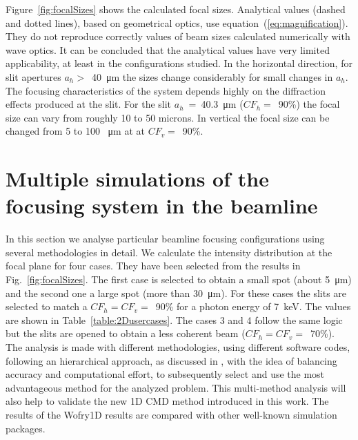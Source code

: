 \documentclass{iucr}              %
\begin{document}
Figure~\ref{fig:focalSizes} shows the calculated focal sizes. Analytical values (dashed and dotted lines), based on geometrical optics, use  equation~(\ref{eq:magnification}). They do not reproduce correctly values of beam sizes calculated numerically with wave optics. It can be concluded that the analytical values have very limited applicability, at least in the configurations studied.
In the horizontal direction, for slit apertures $a_h>$~\SI{40}{\micro\meter} the sizes change considerably for small changes in $a_h$. The focusing characteristics of the system depends highly on the diffraction effects produced at the slit. For the slit $a_h$~=~\SI{40.3}{\micro\meter} ($CF_h=$~90\%) the focal size can vary from roughly 10 to 50 microns.  In vertical the focal size can be changed from 5 to 100 \SI{}{\micro\meter} at at $CF_v=$~90\%.


\section{Multiple simulations of the focusing system in the beamline}
\label{sec:complete-beamline}

In this section we analyse particular beamline focusing configurations using several methodologies in detail. We calculate the intensity distribution at the focal plane for four cases. They have been selected from the results in Fig.~\ref{fig:focalSizes}. The first case is selected to obtain a small spot (about \SI{5}{\micro\meter}) and the second one a large spot (more than \SI{30}{\micro\meter}).  For these cases the slits are selected to match a $CF_h=CF_v=$~90\% for a photon energy of \SI{7}{keV}. The values are shown in Table~\ref{table:2Dusercases}. The cases 3 and 4 follow the same logic but the slits are opened to obtain a less coherent beam ($CF_h=CF_v=$~70\%). The analysis is made with different methodologies, using different software codes, following an hierarchical approach, as discussed in , with the idea of balancing accuracy and computational effort, to subsequently select and use the most advantageous method for the analyzed problem. This multi-method analysis will also help to validate the new 1D CMD method introduced in this work. The results of the Wofry1D results are compared with other well-known simulation packages. 
\end{document}
